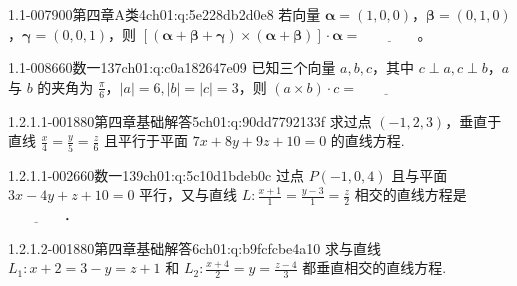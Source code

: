 \begin{q}{1.1-007}{900第四章A类4}{ch01:q:5e228db2d0e8}
若向量 $\boldsymbol{\alpha}=(1,0,0)$，$\boldsymbol{\beta}=(0,1,0)$，$\boldsymbol{\gamma}=(0,0,1)$，则 $[(\boldsymbol{\alpha}+\boldsymbol{\beta}+\boldsymbol{\gamma})\times(\boldsymbol{\alpha}+\boldsymbol{\beta})]\cdot\boldsymbol{\alpha}=\underline{\hspace{4em}}$。
\end{q}

\begin{q}{1.1-008}{660数一137}{ch01:q:c0a182647e09}
已知三个向量 $a,b,c$，其中 $c\perp a,c\perp b$，$a$ 与 $b$ 的夹角为 $\frac{\pi}{6}$，$|a|=6,|b|=|c|=3$，则 $(a\times b)\cdot c=\underline{\hspace{4em}}$
\end{q}

\par\addvspace{2.4ex}\noindent
\begin{minipage}{\linewidth}



\begin{q}{1.2.1.1-001}{880第四章基础解答5}{ch01:q:90dd7792133f}
求过点 $(-1,2,3)$，垂直于直线 $\frac{x}{4}=\frac{y}{5}=\frac{z}{6}$ 且平行于平面 $7x+8y+9z+10=0$ 的直线方程.
\end{q}
\end{minipage}


\begin{q}{1.2.1.1-002}{660数一139}{ch01:q:5c10d1bdeb0c}
过点 $P(-1,0,4)$ 且与平面 $3x-4y+z+10=0$ 平行，又与直线 $L:\frac{x+1}{1}=\frac{y-3}{1}=\frac{z}{2}$ 相交的直线方程是 $\underline{\hspace{4em}}$．
\end{q}

\par\addvspace{2.4ex}\noindent
\begin{minipage}{\linewidth}

\begin{q}{1.2.1.2-001}{880第四章基础解答6}{ch01:q:b9fcfcbe4a10}
求与直线 $L_1:x+2=3-y=z+1$ 和 $L_2:\frac{x+4}{2}=y=\frac{z-4}{3}$ 都垂直相交的直线方程.
\end{q}
\end{minipage}


